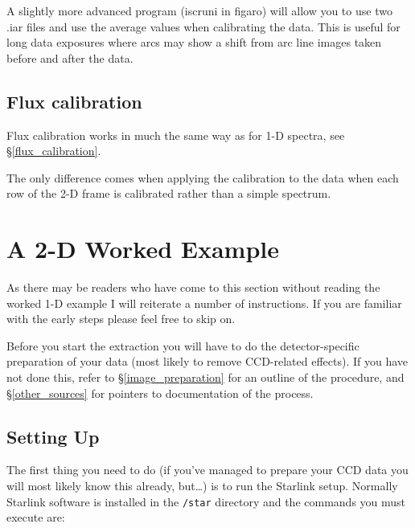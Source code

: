 \documentclass[twoside,11pt]{article}
\newcommand{\stardocinitials}  {SC}
\newcommand{\stardocnumber}    {7.2}
\newcommand{\stardocname}{\stardocinitials /\stardocnumber}
\newcommand{\htmlref}[2]{#1}
\newcommand{\xlabel}[1]{}
\newcommand{\mlabel}[1]{\xlabel{#1}\label{#1}}
\newcommand{\scspec}[2]{#1}
\newcommand{\scspec}[2]{#2}
\begin{document}
A slightly more advanced program (iscruni in figaro) will allow you to
use two .iar files and use the average values when calibrating the
data. This is useful for long data exposures where arcs may show a
shift from arc line images taken before and after the data.


\subsection{\mlabel{fluxcal_2d}Flux calibration}

Flux calibration works in much the same way as for 1-D spectra, see 
\scspec{\S\ref{flux_calibration}}
{\htmlref{{\sl Flux Calibration \&
               Extinction Correction}}{flux_calibration}}.

The only difference comes when applying the calibration to the data
when each row of the 2-D frame is calibrated rather than a simple
spectrum.



\section{\mlabel{longslit_worked_example}A 2-D Worked Example}
\markboth{A 2-D Worked Example}{\stardocname}

As there may be readers who have come to this section without reading
the worked 1-D example I will reiterate a number of instructions. If
you are familiar with the early steps please feel free to skip on.

Before you start the extraction you will have to do the
detector-specific preparation of your data (most likely to remove
CCD-related effects).
If you have not done this, refer to \scspec{\S\ref{image_preparation}}
{\htmlref{Image Preparation}{image_preparation}} for an outline of the
procedure, and \scspec{\S\ref{other_sources}}
{\htmlref{Other Sources of Information}{other_sources}} for pointers
to documentation of the process.


\subsection{Setting Up}

The first thing you need to do (if you've managed to prepare your CCD
data you will most likely know this already, but\ldots ) is to run the
Starlink setup.
Normally Starlink software is installed in the \verb+/star+ directory
and the commands you must execute are:
\end{document}

